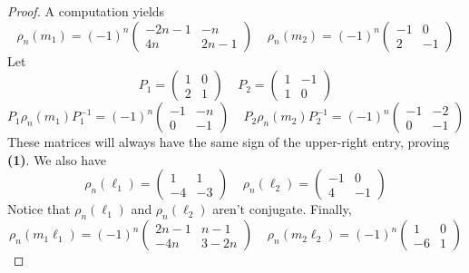 \documentclass[10pt,a4paper]{amsart}
\begin{document}
\begin{proof}
A computation yields
\begin{equation}
	\rho_n(m_1) = (-1)^n\begin{pmatrix}-2n-1 & -n \\ 4n & 2n-1\end{pmatrix} \ \ \ \ \ \rho_n(m_2) = (-1)^n\begin{pmatrix}-1 & 0 \\ 2 & -1\end{pmatrix}
\end{equation}
Let 
\begin{equation}
	P_1 = \begin{pmatrix}1 & 0 \\ 2 & 1 \end{pmatrix} \ \ \ \ \ P_2 = \begin{pmatrix} 1 & -1 \\ 1 & 0 \end{pmatrix}
\end{equation}
\begin{equation}
	P_1\rho_n(m_1)P_1^{-1} = (-1)^n\begin{pmatrix}-1 & -n \\ 0 & -1\end{pmatrix} \ \ \ \ \ P_2\rho_n(m_2)P_2^{-1} = (-1)^n\begin{pmatrix}-1 & -2 \\ 0 & -1\end{pmatrix} 
\end{equation}
These matrices will always have the same sign of the upper-right entry, proving \textbf{(1)}. We also have 
\begin{equation}
	\rho_n(\ell_1) = \begin{pmatrix}1 & 1 \\ -4 & -3\end{pmatrix} \ \ \ \ \ \rho_n(\ell_2) = \begin{pmatrix}-1 & 0 \\ 4 & -1\end{pmatrix}
\end{equation}
Notice that $\rho_n(\ell_1)$ and $\rho_n(\ell_2)$ aren't conjugate. Finally,
\begin{equation}
	\rho_n(m_1\ell_1) = (-1)^n\begin{pmatrix}2n-1 & n-1 \\ -4n & 3-2n\end{pmatrix} \ \ \ \ \ \rho_n(m_2\ell_2) = (-1)^n\begin{pmatrix}1 & 0 \\ -6 & 1\end{pmatrix}

\end{equation}
\end{proof}
\end{document}
